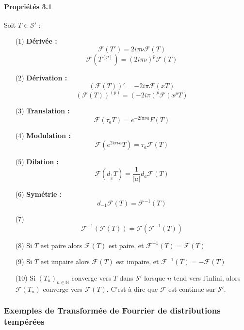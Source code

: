 \documentclass[12pt,a4paper]{report}
\newcommand{\ens}[1]{\ensuremath{\mathbb{#1}}}
\newcommand{\F}{\ensuremath{\mathcal{F}}}
\newcommand{\Sf}{\ensuremath{\mathcal{S}}}
\begin{document}
\paragraph{Propriétés 3.1} Soit \(T \in \Sf'\) :
\begin{itemize}
	\item[(1) \textbf{Dérivée :}]
	\[
		\F(T') = 2i\pi\nu \F(T)
	\]
	\[
		\F(T^{(p)}) = (2i\pi\nu)^p \F(T)
	\]
	
	\item[(2) \textbf{Dérivation :}]
	\[
		(\F(T))' = -2i\pi \F(xT)
	\]
	\[
		(\F(T))^{(p)} = (-2i\pi)^{p} \F(x^pT)
	\]
	
	\item[(3) \textbf{Translation :}]
	\[
		\F(\tau_a T) = e^{-2i\pi\nu a}F(T)
	\]
	
	\item[(4) \textbf{Modulation :}]
	\[
		\F(e^{2i\pi\nu a }T) = \tau_a \F(T)
	\]
	
	\item[(5) \textbf{Dilation :}]
	\[
		\F(d_{\frac{1}{a}}T) = \dfrac{1}{|a|} d_a \F(T) 
	\]
	
	\item[(6) \textbf{Symétrie :}]
	\[
		d_{-1} \F(T) = \F^{-1}(T)
	\]
	
	\item[(7)] 
	\[
		\F^{-1}(\F(T)) = \F(\F^{-1}(T))
	\]
	
	\item[(8)] Si \(T\) est paire alors \(\F(T)\) est paire, et \(\F^{-1}(T) = \F(T)\)
	
	\item[(9)] Si \(T\) est impaire alors \(\F(T)\) est impaire, et \(\F^{-1}(T) = -\F(T)\)
	
	\item[(10)] Si \((T_n)_{n\in\ens{N}}\) converge vers \(T\) dans \(\Sf'\) lorsque \(n\) tend vers l'infini, alors \(\F(T_n)\) converge vers \(\F(T)\). C'est-à-dire que \(\F\) est continue sur \(\Sf'\).
\end{itemize}

\subsubsection{Exemples de Transformée de Fourrier de distributions tempérées}
\end{document}
